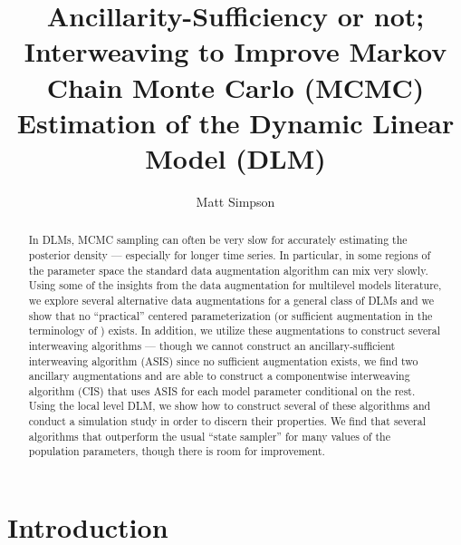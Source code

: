 \documentclass{article}
\begin{document}
\title{Ancillarity-Sufficiency or not; Interweaving to Improve Markov Chain Monte Carlo (MCMC) Estimation of the Dynamic Linear Model (DLM)}
\author{Matt Simpson}
\maketitle

\begin{abstract}
In DLMs, MCMC sampling can often be very slow for accurately estimating the posterior density --- especially for longer time series. In particular, in some regions of the parameter space the standard data augmentation algorithm can mix very slowly. Using some of the insights from the data augmentation for multilevel models literature, we explore several alternative data augmentations for a general class of DLMs and we show that no ``practical'' centered parameterization (or sufficient augmentation in the terminology of ) exists. In addition, we utilize these augmentations to construct several interweaving algorithms --- though we cannot construct an ancillary-sufficient interweaving algorithm (ASIS) since no sufficient augmentation exists, we find two ancillary augmentations and are able to construct a componentwise interweaving algorithm (CIS) that uses ASIS for each model parameter conditional on the rest. Using the local level DLM, we show how to construct several of these algorithms and conduct a simulation study in order to discern their properties. We find that several algorithms that outperform the usual ``state sampler'' for many values of the population parameters, though there is room for improvement.
\end{abstract}


\section{Introduction}\label{sec:Intro}
\end{document}
